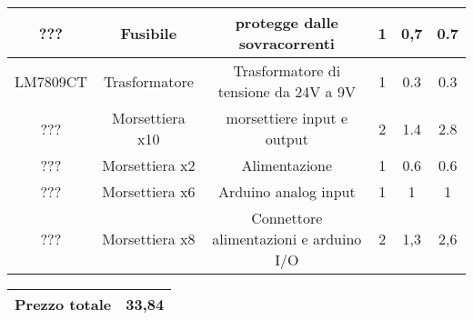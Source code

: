 \documentclass[12pt]{article}
\begin{document}
\begin{center}
\begin{tabular}{| c | c | c | c| c |c|}
        \hline
        \rowcolor{Apricot} ??? & Fusibile & protegge dalle sovracorrenti & 1 & 0,7 & 0.7\\
        \hline
        \rowcolor{Peach} LM7809CT & Trasformatore  & Trasformatore di tensione da 24V a 9V & 1 & 0.3 & 0.3\\
        \hline
        \rowcolor{Apricot} ??? & Morsettiera x10 & morsettiere input e output & 2 & 1.4 & 2.8\\
        \hline
        \rowcolor{Peach} ??? & Morsettiera x2 & Alimentazione & 1 & 0.6 & 0.6\\
        \hline
        \rowcolor{Apricot} ??? & Morsettiera x6 & Arduino analog input & 1 & 1 & 1\\
        \hline
        \rowcolor{Peach} ??? & Morsettiera x8 & Connettore alimentazioni e arduino I/O & 2 & 1,3 & 2,6\\
        \hline
   \end{tabular}
   \vskip 2mm
   \begin{tabular}[h]{|p{4cm}| p{3cm}|  }
       \hline
        \rowcolor{BurntOrange} Prezzo totale & \cellcolor{white} \hspace{1cm} 33,84\\ 
        \hline
   \end{tabular}
   \end{center}
\vfill
\vskip 4mm 
\end{document}

